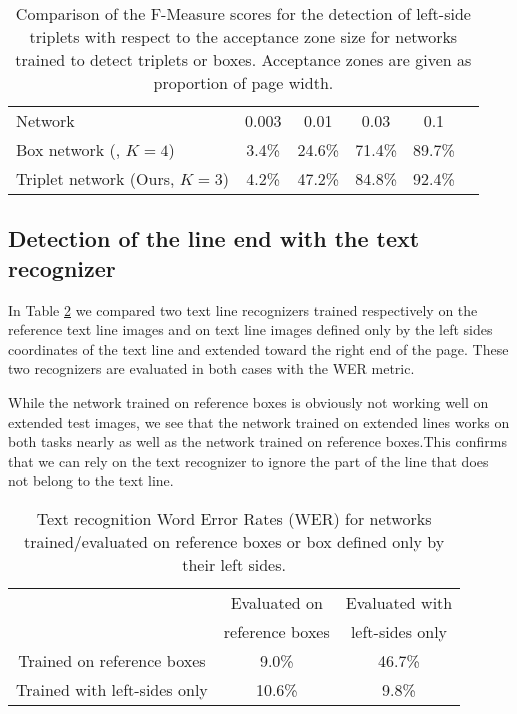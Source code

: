 \documentclass[conference]{IEEEtran}
\begin{document}
\begin{table}
\begin{center}
\caption{Comparison of the F-Measure scores for the detection of left-side triplets with respect to the acceptance zone size for networks trained to detect triplets or boxes. Acceptance zones are given as proportion of page width.}
\label{tab:precisenessTriplet}
\begin{tabular}{lccccc}
Network & 0.003 & 0.01  & 0.03 &  0.1  \\ %
\arrayrulecolor{cwblue1} \toprule
Box network (\cite{moysset2016learning}, $K{=}4$)  & 3.4\% & 24.6\% & 71.4\% & 89.7\% \\ %
Triplet network (Ours, $K{=}3$) & 4.2\% & 47.2\% & 84.8\% & 92.4\% \\ %
\end{tabular}
\end{center}
\end{table}

\subsection{Detection of the line end with the text recognizer}
In Table \ref{tab:reco} we compared two text line recognizers trained respectively on the reference text line images and on text line images defined only by the left sides coordinates of the text line and extended toward the right end of the page. These two recognizers are evaluated in both cases with the WER metric.

While the network trained on reference boxes is obviously not working well on extended test images, we see that the network trained on extended lines works on both tasks nearly as well as the network trained on reference boxes.This confirms that we can rely on the text recognizer to ignore the part of the line that does not belong to the text line.

\begin{table}
\begin{center}
\caption{Text recognition Word Error Rates (WER) for networks trained/evaluated on reference boxes or box defined only by their left sides. }
\label{tab:reco}
\begin{tabular}{c|cc}
 & Evaluated on & Evaluated with \\
 & reference boxes & left-sides only \\
\arrayrulecolor{cwblue1} \toprule
Trained on reference boxes & 9.0\% & 46.7\% \\
Trained with left-sides only & 10.6\% & 9.8\% \\
\end{tabular}
\end{center}
\end{table}
\end{document}
